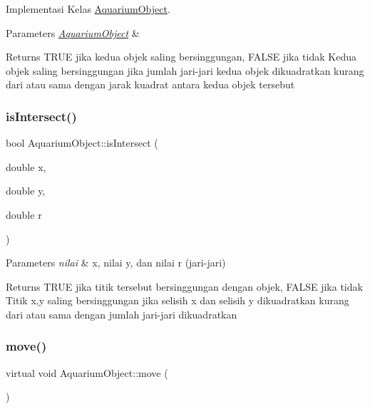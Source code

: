 Implementasi Kelas \mbox{\hyperlink{class_aquarium_object}{Aquarium\+Object}}. 


\begin{DoxyParams}{Parameters}
{\em \mbox{\hyperlink{class_aquarium_object}{Aquarium\+Object}}} & \\
\hline
\end{DoxyParams}
\begin{DoxyReturn}{Returns}
T\+R\+UE jika kedua objek saling bersinggungan, F\+A\+L\+SE jika tidak Kedua objek saling bersinggungan jika jumlah jari-\/jari kedua objek dikuadratkan kurang dari atau sama dengan jarak kuadrat antara kedua objek tersebut 
\end{DoxyReturn}
\mbox{\label{class_aquarium_object_ac307c9bd7e4a5f6b02a4c64fcbd89e84}} 
\subsubsection{\texorpdfstring{is\+Intersect()}{isIntersect()}\hspace{0.1cm}{\footnotesize\ttfamily [2/2]}}
{\footnotesize\ttfamily bool Aquarium\+Object\+::is\+Intersect (\begin{DoxyParamCaption}\item[{double}]{x,  }\item[{double}]{y,  }\item[{double}]{r }\end{DoxyParamCaption})}


\begin{DoxyParams}{Parameters}
{\em nilai} & x, nilai y, dan nilai r (jari-\/jari) \\
\hline
\end{DoxyParams}
\begin{DoxyReturn}{Returns}
T\+R\+UE jika titik tersebut bersinggungan dengan objek, F\+A\+L\+SE jika tidak Titik x,y saling bersinggungan jika selisih x dan selisih y dikuadratkan kurang dari atau sama dengan jumlah jari-\/jari dikuadratkan 
\end{DoxyReturn}
\mbox{\label{class_aquarium_object_a42c4de640f89ac8aebc26b7618578575}} 
\subsubsection{\texorpdfstring{move()}{move()}}
{\footnotesize\ttfamily virtual void Aquarium\+Object\+::move (\begin{DoxyParamCaption}{ }\end{DoxyParamCaption})\hspace{0.3cm}{\ttfamily [pure virtual]}}

